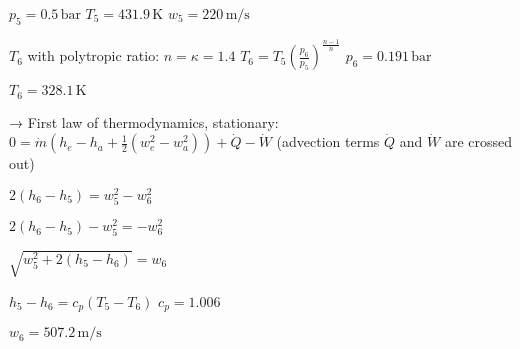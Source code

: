\( p_5 = 0.5 \, \text{bar} \)  
\( T_5 = 431.9 \, \text{K} \)  
\( w_5 = 220 \, \text{m/s} \)  

\( T_6 \) with polytropic ratio: \( n = \kappa = 1.4 \)  
\( T_6 = T_5 \left( \frac{p_6}{p_5} \right)^{\frac{n-1}{n}} \)  
\( p_6 = 0.191 \, \text{bar} \)  

\( T_6 = 328.1 \, \text{K} \)  

→ First law of thermodynamics, stationary:  
\( 0 = \dot{m} \left( h_e - h_a + \frac{1}{2} \left( w_e^2 - w_a^2 \right) \right) + \dot{Q} - \dot{W} \)  
(advection terms \( \dot{Q} \) and \( \dot{W} \) are crossed out)  

\( 2 \left( h_6 - h_5 \right) = w_5^2 - w_6^2 \)  

\( 2 \left( h_6 - h_5 \right) - w_5^2 = -w_6^2 \)  

\( \sqrt{w_5^2 + 2 \left( h_5 - h_6 \right)} = w_6 \)  

\( h_5 - h_6 = c_p \left( T_5 - T_6 \right) \)  
\( c_p = 1.006 \)  

\( w_6 = 507.2 \, \text{m/s} \)